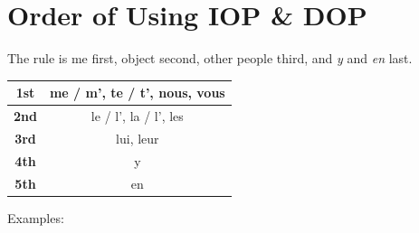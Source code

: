 \documentclass{book}
\begin{document}
\chapter{Order of Using IOP \& DOP}
    The rule is me first, object second, other people third, and \textit{y} and \textit{en} last.
    \begin{center}
        \begin{tabular}{|c|c|}
            \hline
            \textbf{1st} & me / m', te / t', nous, vous \\
            \hline
            \textbf{2nd} & le / l', la / l', les \\
            \hline
            \textbf{3rd} & lui, leur \\
            \hline
            \textbf{4th} & y \\
            \hline
            \textbf{5th} & en \\
            \hline
        \end{tabular}
    \end{center}
    Examples:
\end{document}
